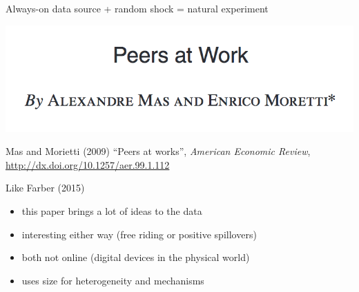\documentclass[aspectratio=169]{beamer}
\def\vf{\vfill}
\begin{document}
\begin{frame}

Always-on data source + random shock = natural experiment

\end{frame}
\begin{frame}

\begin{center}
\includegraphics[width=\textwidth]{figures/mas_peers_2009_title}
\end{center}

\vf
Mas and Morietti (2009) ``Peers at works'', \textit{American Economic Review}, \url{http://dx.doi.org/10.1257/aer.99.1.112}

\end{frame}
\begin{frame}

Like Farber (2015)
\begin{itemize}
\item this paper brings a lot of ideas to the data
\item interesting either way (free riding or positive spillovers)
\item both not online (digital devices in the physical world)
\item uses size for heterogeneity and mechanisms
\end{itemize}

\end{frame}
\end{document}
